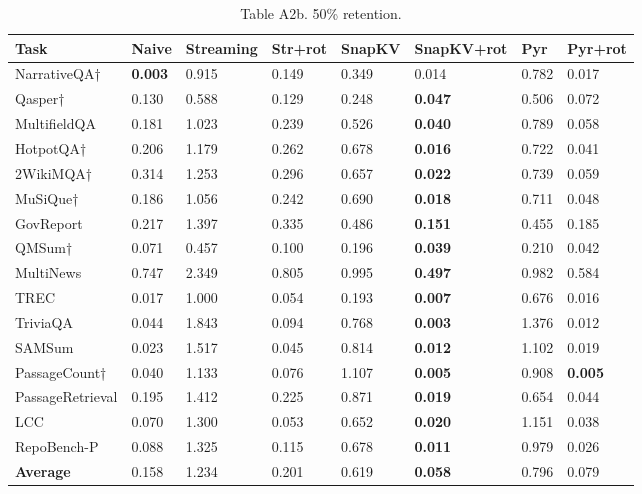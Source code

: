 \documentclass[10pt,letterpaper]{article}
\begin{document}
\begin{table}[H]
\centering
\small
\caption*{Table A2b. 50\% retention.}
\begin{tabular}{@{}llllllll@{}}
\toprule
Task & Naive & Streaming & Str+rot & SnapKV & SnapKV+rot & Pyr &
Pyr+rot\\
\midrule
    NarrativeQA† & \textbf{0.003} & 0.915 & 0.149 & 0.349 & 0.014 & 0.782 & 0.017\\
    Qasper† & 0.130 & 0.588 & 0.129 & 0.248 & \textbf{0.047} & 0.506 & 0.072\\
    MultifieldQA & 0.181 & 1.023 & 0.239 & 0.526 & \textbf{0.040} & 0.789 & 0.058\\
    HotpotQA† & 0.206 & 1.179 & 0.262 & 0.678 & \textbf{0.016} & 0.722 & 0.041\\
    2WikiMQA† & 0.314 & 1.253 & 0.296 & 0.657 & \textbf{0.022} & 0.739 & 0.059\\
    MuSiQue† & 0.186 & 1.056 & 0.242 & 0.690 & \textbf{0.018} & 0.711 & 0.048\\
    GovReport & 0.217 & 1.397 & 0.335 & 0.486 & \textbf{0.151} & 0.455 & 0.185\\
    QMSum† & 0.071 & 0.457 & 0.100 & 0.196 & \textbf{0.039} & 0.210 & 0.042\\
    MultiNews & 0.747 & 2.349 & 0.805 & 0.995 & \textbf{0.497} & 0.982 & 0.584\\
    TREC & 0.017 & 1.000 & 0.054 & 0.193 & \textbf{0.007} & 0.676 & 0.016\\
    TriviaQA & 0.044 & 1.843 & 0.094 & 0.768 & \textbf{0.003} & 1.376 & 0.012\\
    SAMSum & 0.023 & 1.517 & 0.045 & 0.814 & \textbf{0.012} & 1.102 & 0.019\\
    PassageCount† & 0.040 & 1.133 & 0.076 & 1.107 & \textbf{0.005} & 0.908 & \textbf{0.005}\\
    PassageRetrieval & 0.195 & 1.412 & 0.225 & 0.871 & \textbf{0.019} & 0.654 & 0.044\\
    LCC & 0.070 & 1.300 & 0.053 & 0.652 & \textbf{0.020} & 1.151 & 0.038\\
    RepoBench-P & 0.088 & 1.325 & 0.115 & 0.678 & \textbf{0.011} & 0.979 & 0.026\\
    \textbf{Average}  &  0.158  &  1.234 &  0.201  &  0.619  &  \textbf{0.058}  &  0.796  &  0.079\\
\bottomrule
\end{tabular}
\end{table}
\end{document}
